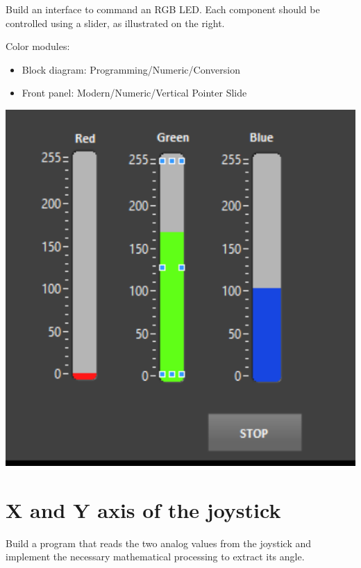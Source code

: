 \documentclass{labo}
\begin{document}
\begin{minipage}{.45\textwidth}
Build an interface to command an RGB LED.
Each component should be controlled using a slider, as illustrated on the right.

\begin{leftbar}
Color modules:
\begin{itemize}
  \item Block diagram: Programming/Numeric/Conversion
  \item Front panel: Modern/Numeric/Vertical Pointer Slide
\end{itemize}
\end{leftbar}
\end{minipage}
\hfill
\begin{minipage}{.5\textwidth}
\includegraphics[width=\textwidth]{front-panel-rgb.png}
\end{minipage}



\section{X and Y axis of the joystick}\label{sec:joystick}
Build a program that reads the two analog values from the joystick and implement the necessary mathematical processing to extract its angle.
\end{document}
